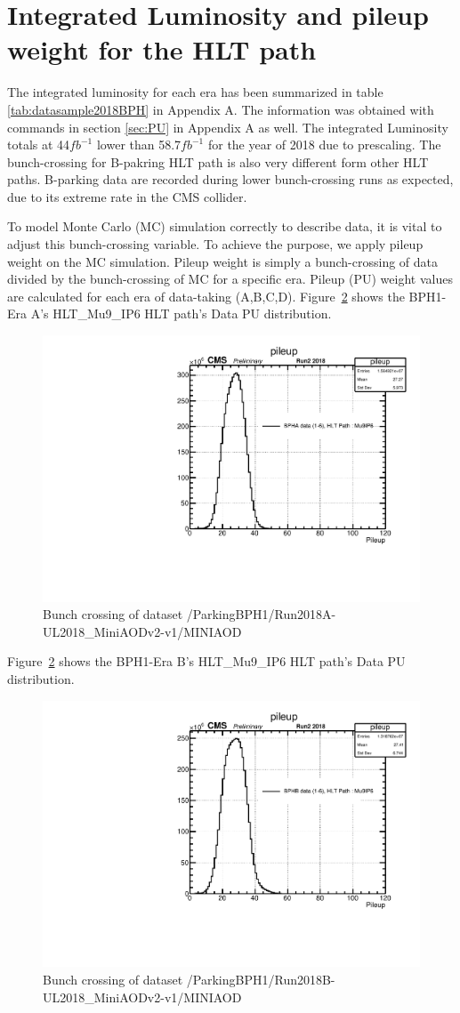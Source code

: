 \section{Integrated Luminosity and pileup weight for the HLT path}

The integrated luminosity for each era has been summarized in table \ref{tab:datasample2018BPH} in Appendix A. 
The information was obtained with commands in section \ref{sec:PU} in Appendix A as well.
The integrated Luminosity totals at 44$fb^{-1}$ lower than 58.7$fb^{-1}$ for the year of 2018 due to prescaling.
The bunch-crossing for B-pakring HLT path is also very different form other HLT paths.
B-parking data are recorded during lower bunch-crossing runs as expected, due to its extreme rate in the CMS collider.

To model Monte Carlo (MC) simulation correctly to describe data, it is vital to adjust this bunch-crossing variable. 
To achieve the purpose, we apply pileup weight on the MC simulation.
Pileup weight is simply a bunch-crossing of data divided by the bunch-crossing of MC for a specific era.
Pileup (PU) weight values are calculated for each era of data-taking (A,B,C,D).
Figure~\ref{fig:EraAData} shows the BPH1-Era A's HLT\_Mu9\_IP6 HLT path's Data PU distribution.
\begin{figure}[h!]
  \caption{Bunch crossing of dataset /ParkingBPH1/Run2018A-UL2018\_MiniAODv2-v1/MINIAOD}
  \label{fig:EraAData}
  \centering
  \includegraphics[width=0.67\linewidth]{figs/NVtx_BPHA.pdf}

\end{figure}

Figure~\ref{fig:EraAData} shows the BPH1-Era B's HLT\_Mu9\_IP6 HLT path's Data PU distribution.
\begin{figure}[h!]
  \caption{Bunch crossing of dataset /ParkingBPH1/Run2018B-UL2018\_MiniAODv2-v1/MINIAOD}
  \label{fig:EraAData}
  \centering
  \includegraphics[width=0.67\linewidth]{figs/NVtx_BPHB.pdf}

\end{figure}

